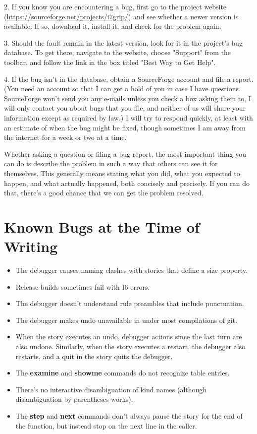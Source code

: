 \documentclass{book}
\newcommand{\glkinput}[1]{\textbf{#1}}
\begin{document}
2. If you know you are encountering a bug, first go to the project website
(\url{https://sourceforge.net/projects/i7grip/}) and see whether a newer version
is available.  If so, download it, install it, and check for the problem again.

3. Should the fault remain in the latest version, look for it in the project's
bug database.  To get there, navigate to the website, choose "Support" from the
toolbar, and follow the link in the box titled "Best Way to Get Help".

4. If the bug isn't in the database, obtain a SourceForge account and file a
report.  (You need an account so that I can get a hold of you in case I have
questions.  SourceForge won't send you any e-mails unless you check a box asking
them to, I will only contact you about bugs that you file, and neither of us
will share your information except as required by law.)  I will try to respond
quickly, at least with an estimate of when the bug might be fixed, though
sometimes I am away from the internet for a week or two at a time.

Whether asking a question or filing a bug report, the most important thing you
can do is describe the problem in such a way that others can see it for
themselves.  This generally means stating what you did, what you expected to
happen, and what actually happened, both concisely and precisely.  If you can do
that, there's a good chance that we can get the problem resolved.

\section*{Known Bugs at the Time of Writing}
\label{known}

\begin{itemize}
  \item{The debugger causes naming clashes with stories that define a size
    property.}
  \item{Release builds sometimes fail with I6 errors.}
  \item{The debugger doesn't understand rule preambles that include punctuation.}
  \item{The debugger makes undo unavailable in under most compilations of git.}
  \item{When the story executes an undo, debugger actions since the last turn
    are also undone.  Similarly, when the story executes a restart, the debugger
    also restarts, and a quit in the story quits the debugger.}
  \item{The \glkinput{examine} and \glkinput{showme} commands do not recognize
    table entries.}
  \item{There's no interactive disambiguation of kind names (although
    disambiguation by parentheses works).}
  \item{The \glkinput{step} and \glkinput{next} commands don't always pause the
    story for the end of the function, but instead stop on the next line in the
    caller.}
\end{itemize}
\end{document}
